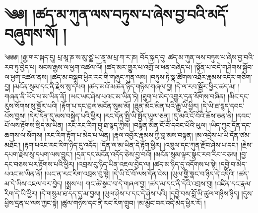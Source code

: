 \chapter{༄༅། །ཚད་མ་ཀུན་ལས་བཏུས་པ་ཞེས་བྱ་བའི་མདོ་བཞུགས་སོ། །}༄༅༅། །རྒྱ་གར་སྐད་དུ། པྲ་མཱ་ཎ་ས་མུ་ཙྪ་ཡ་ནཱ་མ་པྲ་ཀ་ར་ཎ། བོད་སྐད་དུ། ཚད་མ་ཀུན་ལས་བཏུས་པ་ཞེས་བྱ་བའི་རབ་ཏུ་བྱེད་པ། སངས་རྒྱས་ལ་ཕྱག་འཚལ་ལོ། །ཚད་མར་གྱུར་པ་འགྲོ་ལ་ཕན་བཞེད་པ། །སྟོན་པ་བདེ་གཤེགས་སྐྱོབ་ལ་ཕྱག་འཚལ་ནས། །ཚད་མ་བསྒྲུབ་ཕྱིར་རང་གི་གཞུང་ཀུན་ལས། །བཏུས་ཏེ་སྣ་ཚོགས་འཐོར་རྣམས་འདིར་གཅིག་བྱ། །མངོན་སུམ་དང་ནི་རྗེས་སུ་དཔག །ཚད་མའོ་མཚན་ཉིད་གཉིས་གཞལ་བྱ། །དེ་ལ་རབ་སྦྱོར་ཕྱིར་ཚད་མ། །གཞན་ནི་ཡོད་པ་མ་ཡིན་ནོ། །ཡང་ཡང་ཤེས་པའང་མ་ཡིན་ཏེ། །ཐུག་པ་མེད་འགྱུར་དྲན་སོགས་བཞིན། །མིང་དང་རུས་སོགས་སུ་སྦྱོར་པའི། །རྟོག་པ་དང་བྲལ་མངོན་སུམ་མོ། །ཐུན་མོང་མིན་པའི་རྒྱུ་ཡི་ཕྱིར། །དེ་ཡི་ཐ་སྙད་དབང་པོས་བྱས། །དེར་དོན་དུ་མས་བསྐྱེད་པའི་ཕྱིར། །རང་དོན་སྤྱི་ཡི་སྤྱོད་ཡུལ་ཅན། །དུ་མའི་ངོ་བོའི་ཆོས་ཅན་ནི། །དབང་པོ་ལས་རྟོགས་སྲིད་མ་ཡིན། །རང་རང་རིག་བྱ་ཐ་སྙད་ཀྱིས། །བསྟན་མིན་ངོ་བོ་དབང་པོའི་ཡུལ། །ཡིད་ཀྱང་དོན་དང་ཆགས་ལ་སོགས། །རང་རིག་རྟོག་པ་མེད་པ་ཡིན། །རྣལ་འབྱོར་རྣམས་ཀྱི་བླ་མས་བསྟན། །མ་འདྲེས་པ་ཡི་དོན་ཙམ་མཐོང་། །རྟག་པའང་རང་རིག་ཉིད་དུ་འདོད། །དོན་ལ་མ་ཡིན་དེ་རྟོག་ཕྱིར། །འཁྲུལ་དང་ཀུན་རྫོབ་ཤེས་པ་དང་། །རྗེས་དཔག་རྗེས་སུ་དཔག་ལས་བྱུང་། །དྲན་དང་མངོན་འདོད་ཅེས་བྱ་བའོ། །མངོན་སུམ་ལྟར་སྣང་རབ་རིབ་བཅས། །བྱ་དང་བཅས་པར་རྟོགས་པའི་ཕྱིར། །འབྲས་བུ་ཉིད་ཡིན་འཇལ་བྱེད་ལ། །ཚད་མ་ཉིད་དུ་འདོགས་པ་སྟེ། །དབྱེ་བ་མེད་པའང་མ་ཡིན་ནོ། །ཡང་ན་རང་རིག་འབྲས་བུ་སྟེ། །དེ་ཡི་ངོ་བོ་ལས་དོན་ངེས། །ཡུལ་གྱི་སྣང་བ་ཉིད་དེ་འདིའི། །ཚད་མ་དེ་ཡིས་འཇལ་བར་བྱེད། །སྨྲས་པ། གང་ཚེ་སྣང་བ་དེ་གཞལ་བྱ། །ཚད་མ་དང་ནི་དེའི་འབྲས་བུ། །འཛིན་དང་རྣམ་རིག་དེ་ཡི་ཕྱིར། །དེ་གསུམ་ཐ་དད་དུ་མ་བྱས། །ཡུལ་ཤེས་པ་དང་དེ་ཤེས་པའི། །དབྱེ་བས་བློ་ཡི་ཚུལ་གཉིས་ཉིད། །དུས་ཕྱིས་དྲན་པ་ལས་ཀྱང་སྟེ། །ཚུལ་གཉིས་དང་ནི་རང་རིག་གྲུབ། །མ་མྱོང་བར་འདི་མེད་ཕྱིར་རོ། །
